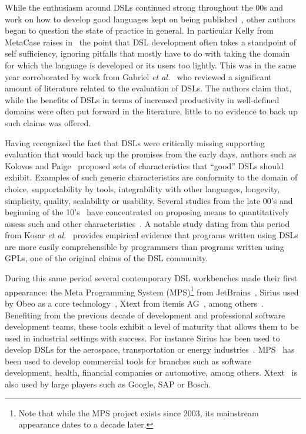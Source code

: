 \documentclass{scrartcl}
\begin{document}
While the enthusiasm around DSLs continued strong throughout the 00s and work on
how to develop good languages kept on being published~\cite{Voelter09}, other
authors began to question the state of practice in general. In particular Kelly
from MetaCase raises in~\cite{Kelly2009} the point that DSL development often
takes a standpoint of self sufficiency, ignoring pitfalls that mostly have to do
with taking the domain for which the language is developed or its users too
lightly. This was in the same year corroborated by work from Gabriel \emph{et
al.}~\cite{Gabriel09} who reviewed a significant amount of literature related to
the evaluation of DSLs. The authors claim that, while the benefits of DSLs in
terms of increased productivity in well-defined domains were often put forward
in the literature, little to no evidence to back up such claims was offered.

Having recognized the fact that DSLs were critically missing supporting
evaluation that would back up the promises from the early days, authors such as
Kolovos and Paige~\cite{Kolovos06} proposed sets of characteristics that
``good'' DSLs should exhibit. Examples of such generic characteristics are
conformity to the domain of choice, supportability by tools, integrability with
other languages, longevity, simplicity, quality, scalability or usability.
Several studies from the late 00's and beginning of the 10's~\cite{Kolovos06}
have concentrated on proposing means to quantitatively assess such
and other
characteristics~\cite{KellyTolvanen09,Hermans09,Barisic:12,Kahraman2015}. A
notable study dating from this period from Kosar \emph{et al.}~\cite{Kosar2012}
provides empirical evidence that programs written using DSLs are more easily
comprehensible by programmers than programs written using GPLs, one of the
original claims of the DSL community.

During this same period several contemporary DSL workbenches made their first
appearance: the Meta Programming System (MPS)\footnote{Note that while the MPS
project exists since 2003, its mainstream appearance dates to a decade later.}
from JetBrains~\cite{mps}, Sirius used by Obeo as a core
technology~\cite{sirius}, Xtext from itemis AG~\cite{xtext}, among
others~\cite{Kelly:2013}. Benefiting from the previous decade of development
and professional software development teams, these tools exhibit a level of
maturity that allows them to be used in industrial settings with success. For instance Sirius has been used to develop
DSLs for the aerospace, transportation or energy industries~\cite{obeo}.
MPS~\cite{mps} has been used to develop commercial tools for branches such as
software development, health, financial companies or automotive, among others.
Xtext~\cite{xtext} is also used by large players such as Google, SAP or Bosch.
\end{document}
